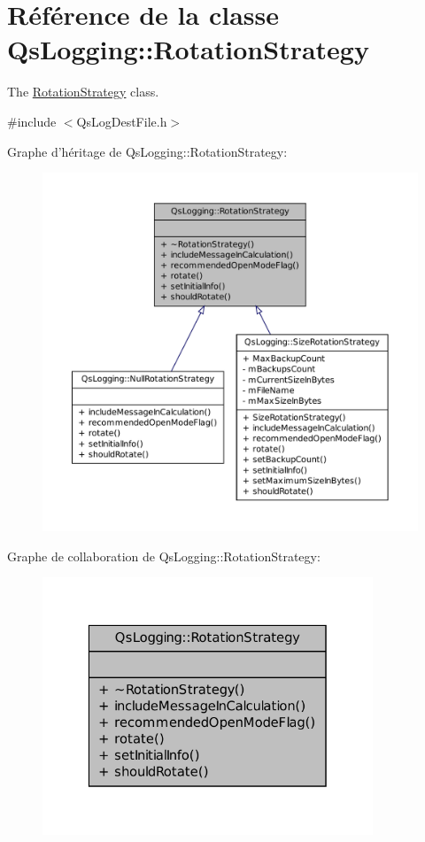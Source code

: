 \hypertarget{classQsLogging_1_1RotationStrategy}{\section{Référence de la classe Qs\-Logging\-:\-:Rotation\-Strategy}
\label{classQsLogging_1_1RotationStrategy}
}


The \hyperlink{classQsLogging_1_1RotationStrategy}{Rotation\-Strategy} class.  




{\ttfamily \#include $<$Qs\-Log\-Dest\-File.\-h$>$}



Graphe d'héritage de Qs\-Logging\-:\-:Rotation\-Strategy\-:
\nopagebreak
\begin{figure}[H]
\begin{center}
\leavevmode
\includegraphics[width=350pt]{classQsLogging_1_1RotationStrategy__inherit__graph}
\end{center}
\end{figure}


Graphe de collaboration de Qs\-Logging\-:\-:Rotation\-Strategy\-:
\nopagebreak
\begin{figure}[H]
\begin{center}
\leavevmode
\includegraphics[width=280pt]{classQsLogging_1_1RotationStrategy__coll__graph}
\end{center}
\end{figure}
